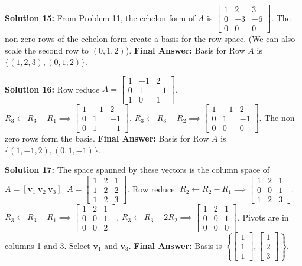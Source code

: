 \documentclass[11pt]{article}
\begin{document}
\vspace{0.5cm}
\textbf{Solution 15:}
From Problem 11, the echelon form of $A$ is $\begin{bmatrix} 1 & 2 & 3 \\ 0 & -3 & -6 \\ 0 & 0 & 0 \end{bmatrix}$. The non-zero rows of the echelon form create a basis for the row space. (We can also scale the second row to $(0, 1, 2)$).
\textbf{Final Answer:} Basis for Row $A$ is $\{(1, 2, 3), (0, 1, 2)\}$.

\vspace{0.5cm}
\textbf{Solution 16:}
Row reduce $A = \begin{bmatrix} 1 & -1 & 2 \\ 0 & 1 & -1 \\ 1 & 0 & 1 \end{bmatrix}$.
$R_3 \leftarrow R_3 - R_1 \implies \begin{bmatrix} 1 & -1 & 2 \\ 0 & 1 & -1 \\ 0 & 1 & -1 \end{bmatrix}$.
$R_3 \leftarrow R_3 - R_2 \implies \begin{bmatrix} 1 & -1 & 2 \\ 0 & 1 & -1 \\ 0 & 0 & 0 \end{bmatrix}$.
The non-zero rows form the basis.
\textbf{Final Answer:} Basis for Row $A$ is $\{(1, -1, 2), (0, 1, -1)\}$.

\vspace{0.5cm}
\textbf{Solution 17:}
The space spanned by these vectors is the column space of $A = [\mathbf{v}_1 \ \mathbf{v}_2 \ \mathbf{v}_3]$.
$A = \begin{bmatrix} 1 & 2 & 1 \\ 1 & 2 & 2 \\ 1 & 2 & 3 \end{bmatrix}$.
Row reduce:
$R_2 \leftarrow R_2 - R_1 \implies \begin{bmatrix} 1 & 2 & 1 \\ 0 & 0 & 1 \\ 1 & 2 & 3 \end{bmatrix}$.
$R_3 \leftarrow R_3 - R_1 \implies \begin{bmatrix} 1 & 2 & 1 \\ 0 & 0 & 1 \\ 0 & 0 & 2 \end{bmatrix}$.
$R_3 \leftarrow R_3 - 2R_2 \implies \begin{bmatrix} 1 & 2 & 1 \\ 0 & 0 & 1 \\ 0 & 0 & 0 \end{bmatrix}$.
Pivots are in columns 1 and 3. Select $\mathbf{v}_1$ and $\mathbf{v}_3$.
\textbf{Final Answer:} Basis is $\left\{ \begin{bmatrix} 1 \\ 1 \\ 1 \end{bmatrix}, \begin{bmatrix} 1 \\ 2 \\ 3 \end{bmatrix} \right\}$.
\end{document}
